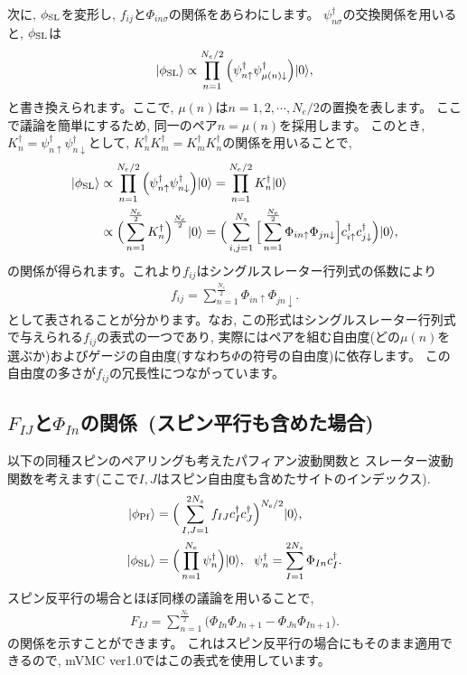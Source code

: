 次に, $\phi_{\rm SL}$を変形し, $f_{ij}$と$\Phi_{in\sigma}$の関係をあらわにします。
$\psi^{\dagger}_{n\sigma}$の交換関係を用いると, $\phi_{\rm SL}$は
\begin{align}
|\phi_{\rm SL}\rangle \propto \prod_{n=1}^{N_{e}/2}\Big(\psi_{n\uparrow}^{\dagger}\psi_{\mu(n)\downarrow}^{\dagger}\Big)|0\rangle,
\end{align}
と書き換えられます。ここで, $\mu(n)$は$n= 1, 2, \cdots, N_{e}/2$の置換を表します。
ここで議論を簡単にするため, 同一のペア$n=\mu(n)$を採用します。
このとき, $K_{n}^{\dagger}=\psi_{n\uparrow}^{\dagger}\psi_{n\downarrow}^{\dagger}$として, 
$K_{n}^{\dagger}K_{m}^{\dagger}=K_{m}^{\dagger}K_{n}^{\dagger}$の関係を用いることで, 
\begin{align}
|\phi_{\rm SL}\rangle &\propto \prod_{n=1}^{N_{e}/2}\Big(\psi_{n\uparrow}^{\dagger}\psi_{n\downarrow}^{\dagger}\Big)|0\rangle
=\prod_{n=1}^{N_{e}/2} K_{n}^{\dagger}|0\rangle \\
&\propto\Big(\sum_{n=1}^{\frac{N_{e}}{2}}K_{n}^{\dagger}\Big)^{\frac{N_{e}}{2}} |0\rangle
=\Big(\sum_{i,j=1}^{N_{s}}\Big[\sum_{n=1}^{\frac{N_{e}}{2}}\Phi_{in\uparrow}\Phi_{jn\downarrow}\Big]
c_{i\uparrow}^{\dagger}c_{j\downarrow}^{\dagger}\Big)|0\rangle,
\end{align}
の関係が得られます。これより$f_{ij}$はシングルスレーター行列式の係数により
\begin{align}
f_{ij}=\sum_{n=1}^{\frac{N_{e}}{2}}\Phi_{in\uparrow}\Phi_{jn\downarrow}.
\end{align}
として表されることが分かります。なお, この形式はシングルスレーター行列式で与えられる$f_{ij}$の表式の一つであり, 
実際にはペアを組む自由度(どの$\mu(n)$を選ぶか)およびゲージの自由度(すなわち$\Phi$の符号の自由度)に依存します。
この自由度の多さが$f_{ij}$の冗長性につながっています。

\subsection{$F_{IJ}$と$\Phi_{In}$の関係~(スピン平行も含めた場合)}
以下の同種スピンのペアリングも考えたパフィアン波動関数と
スレーター波動関数を考えます(ここで$I,J$はスピン自由度も含めたサイトのインデックス).
\begin{align}
|\phi_{\rm Pf}\rangle&=\Big(\sum_{I,J=1}^{2N_{s}}f_{IJ}c_{I}^{\dagger}c_{J}^{\dagger}\Big)^{N_{\rm e}/2}|0\rangle, \\
|\phi_{\rm SL}\rangle&=\Big(\prod_{n=1}^{N_{e}}\psi_{n}^{\dagger}\Big)|0\rangle,~~\psi_{n}^{\dagger}=\sum_{I=1}^{2N_{s}}\Phi_{In}c^{\dagger}_{I}.
\end{align}
スピン反平行の場合とほぼ同様の議論を用いることで, 
\begin{align}
F_{IJ}=\sum_{n=1}^{\frac{N_{e}}{2}}\Big(\Phi_{In}\Phi_{Jn+1}-\Phi_{Jn}\Phi_{In+1}\Big).
\end{align}
の関係を示すことができます。
これはスピン反平行の場合にもそのまま適用できるので, 
mVMC ver1.0ではこの表式を使用しています。


